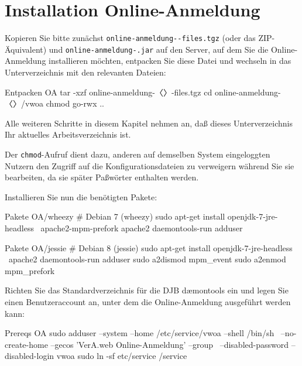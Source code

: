 \ifoa

\section{Installation Online-Anmeldung}\label{sec:setup-oa}

\begin{minipage}{\textwidth}
Kopieren Sie bitte zunächst \texttt{online-anmeldung-\vwiaverssw{}-files.tgz}
(oder das ZIP-Äquivalent) und \texttt{online-anmeldung-\vwiaverssw{}.jar}
auf den Server, auf dem Sie die Online-Anmeldung installieren möchten,
entpacken Sie diese Datei und wechseln in das Unterverzeichnis mit den
relevanten Dateien:

\begin{lstdump}{Entpacken OA}
tar -xzf online-anmeldung-〈\lstdumpesc{\vwiaverssw}〉-files.tgz
cd online-anmeldung-〈\lstdumpesc{\vwiaverssw}〉/vwoa
chmod go-rwx ..
\end{lstdump}
\end{minipage}

Alle weiteren Schritte in diesem Kapitel nehmen an, daß dieses
Unterverzeichnis Ihr aktuelles Arbeitsverzeichnis ist.

Der \texttt{chmod}-Aufruf dient dazu, anderen auf demselben System
eingeloggten Nutzern den Zugriff auf die Konfigurationsdateien zu
verweigern während Sie sie bearbeiten, da sie später Paßwörter
enthalten werden.

\begin{minipage}{\textwidth}
Installieren Sie nun die benötigten Pakete:

\begin{lstdump}{Pakete OA/wheezy}
# Debian 7 (wheezy)
sudo apt-get install openjdk-7-jre-headless \
    apache2-mpm-prefork apache2 daemontools-run adduser
\end{lstdump}

\begin{lstdump}{Pakete OA/jessie}
# Debian 8 (jessie)
sudo apt-get install openjdk-7-jre-headless \
    apache2 daemontools-run adduser
sudo a2dismod mpm_event
sudo a2enmod mpm_prefork
\end{lstdump}
\end{minipage}

\begin{minipage}{\textwidth}
Richten Sie das Standardverzeichnis für die DJB dæmontools
ein und legen Sie einen Benutzeraccount an, unter dem die
Online-Anmeldung ausgeführt werden kann:

\begin{lstdump}{Prereqs OA}
sudo adduser --system --home /etc/service/vwoa --shell /bin/sh \
    --no-create-home --gecos 'VerA.web Online-Anmeldung' --group \
    --disabled-password --disabled-login vwoa
sudo ln -sf etc/service /service
\end{lstdump}
\end{minipage}

